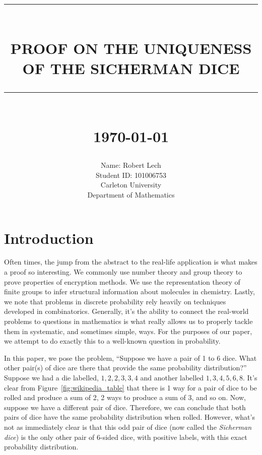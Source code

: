 \documentclass[12pt]{report}
\newcommand{\HRule}[1]{\rule{\linewidth}{#1}}
\begin{document}
\title{ \HRule{0.5pt} \\
		\LARGE \textbf{\uppercase{Proof on the Uniqueness of the Sicherman dice}}
		\HRule{2pt} \\ [0.5cm]
		\normalsize \today \vspace*{5\baselineskip}}

\date{}

\author{
		Name: Robert Lech \\
        Student ID\@: 101006753 \\ 
		Carleton University \\
		Department of Mathematics }

\maketitle

\sectionfont{\scshape}


\section*{Introduction}
Often times, the jump from the abstract to the real-life application is what makes a proof so interesting. We
commonly use number theory and group theory to prove properties of encryption methods. We use the
representation theory of finite groups to infer structural information about molecules in chemistry. Lastly,
we note that problems in discrete probability rely heavily on techniques developed in combinatorics.
Generally, it's the ability to connect the real-world problems to questions in mathematics is what really
allows us to properly tackle them in systematic, and sometimes simple, ways. For the purposes of our paper, we
attempt to do exactly this to a well-known question in probability.

In this paper, we pose the problem, ``Suppose we have a pair of 1 to 6 dice. What other pair\@(s) of dice are
there that provide the same probability distribution?'' Suppose we had a die labelled, $1,2,2,3,3,4$ and
another labelled $1,3,4,5,6,8$. It's clear from Figure~\ref{fig:wikipedia_table} that there is 1 way for a
pair of dice to be rolled and produce a sum of 2, 2 ways to produce a sum of 3, and so on. Now, suppose we
have a different pair of dice. Therefore, we can conclude that both pairs of dice have the same probability
distribution when rolled. However, what's not as immediately clear is that this odd pair of dice (now called
the \textit{Sicherman dice}) is the only other pair of 6-sided dice, with positive labels, with this exact
probability distribution.
\end{document}
